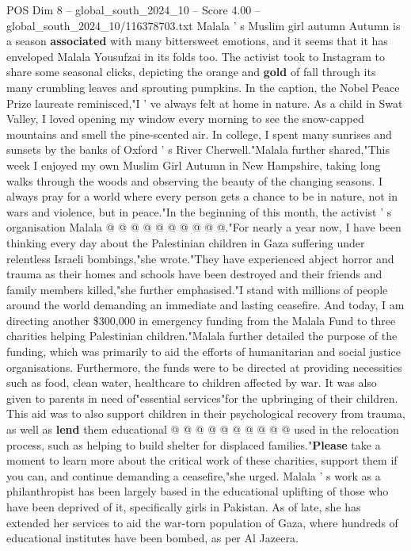 \begin{textsample}{POS Dim 8 – global\_south\_2024\_10 – Score 4.00 – global\_south\_2024\_10/116378703.txt}  \label{ex:f8_pos_303}
Malala ' s Muslim girl autumn Autumn is a season \textbf{associated} with many bittersweet emotions, and it seems that it has enveloped Malala Yousufzai in its folds too.
The activist took to Instagram to share some seasonal clicks, depicting the orange and \textbf{gold} of fall through its many crumbling leaves and sprouting pumpkins.
In the caption, the Nobel Peace Prize laureate reminisced,"I ' ve always felt at home in nature.
As a child in Swat Valley, I loved opening my window every morning to see the snow-capped mountains and smell the pine-scented air.
In college, I spent many sunrises and sunsets by the banks of Oxford ' s River Cherwell."Malala further shared,"This week I enjoyed my own Muslim Girl Autumn in New Hampshire, taking long walks through the woods and observing the beauty of the changing seasons.
I always pray for a world where every person gets a chance to be in nature, not in wars and violence, but in peace."In the beginning of this month, the activist ' s organisation Malala @ @ @ @ @ @ @ @ @ @."For nearly a year now, I have been thinking every day about the Palestinian children in Gaza suffering under relentless Israeli bombings,"she wrote."They have experienced abject horror and trauma as their homes and schools have been destroyed and their friends and family members killed,"she further emphasised."I stand with millions of people around the world demanding an immediate and lasting ceasefire.
And today, I am directing another \$300,000 in emergency funding from the Malala Fund to three charities helping Palestinian children."Malala further detailed the purpose of the funding, which was primarily to aid the efforts of humanitarian and social justice organisations.
Furthermore, the funds were to be directed at providing necessities such as food, clean water, healthcare to children affected by war.
It was also given to parents in need of"essential services"for the upbringing of their children.
This aid was to also support children in their psychological recovery from trauma, as well as \textbf{lend} them educational @ @ @ @ @ @ @ @ @ @ used in the relocation process, such as helping to build shelter for displaced families."\textbf{Please} take a moment to learn more about the critical work of these charities, support them if you can, and continue demanding a ceasefire,"she urged.
Malala ' s work as a philanthropist has been largely based in the educational uplifting of those who have been deprived of it, specifically girls in Pakistan.
As of late, she has extended her services to aid the war-torn population of Gaza, where hundreds of educational institutes have been bombed, as per Al Jazeera.

\end{textsample}
